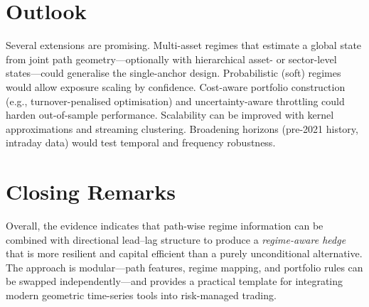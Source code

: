 \section*{Outlook}
Several extensions are promising. Multi-asset regimes that estimate a global state from joint path geometry—optionally with hierarchical asset- or sector-level states—could generalise the single-anchor design. Probabilistic (soft) regimes would allow exposure scaling by confidence. Cost-aware portfolio construction (e.g., turnover-penalised optimisation) and uncertainty-aware throttling could harden out-of-sample performance. Scalability can be improved with kernel approximations and streaming clustering. Broadening horizons (pre-2021 history, intraday data) would test temporal and frequency robustness.

\section*{Closing Remarks}
Overall, the evidence indicates that path-wise regime information can be combined with directional lead–lag structure to produce a \emph{regime-aware hedge} that is more resilient and capital efficient than a purely unconditional alternative. The approach is modular—path features, regime mapping, and portfolio rules can be swapped independently—and provides a practical template for integrating modern geometric time-series tools into risk-managed trading.
